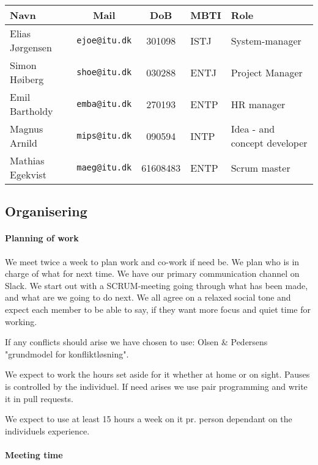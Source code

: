 \documentclass[11pt]{article}
\begin{document}
\begin{table}[h!]
    \centering
    \begin{tabular}{l c c l l}
        \textbf{Navn} & \textbf{Mail} & \textbf{DoB} & \textbf{MBTI} & \textbf{Role} \\ \hline
        Elias Jørgensen & \texttt{ejoe@itu.dk} & 301098 & ISTJ & System-manager\\
        Simon Høiberg & \texttt{shoe@itu.dk} & 030288 & ENTJ & Project Manager \\
        Emil Bartholdy & \texttt{emba@itu.dk} & 270193 & ENTP & HR manager\\
        Magnus Arnild & \texttt{mips@itu.dk} & 090594 & INTP & Idea - and concept developer\\
        Mathias Egekvist & \texttt{maeg@itu.dk} & 61608483 & ENTP & Scrum master \\
    \end{tabular}
\end{table}

\subsection{Organisering}

\paragraph{Planning of work}
We meet twice a week to plan work and co-work if need be. We plan who is in charge of what for next time. We have our primary communication channel on Slack.
We start out with a SCRUM-meeting going through what has been made, and what are we going to do next.
We all agree on a relaxed social tone and expect each member to be able to say, if they want more focus and quiet time for working.

If any conflicts should arise we have chosen to use:
Olsen & Pedersens "grundmodel for konfliktløsning".

We expect to work the hours set aside for it whether at home or on sight. Pauses is controlled by the individuel. If need arises we use pair programming and write it in pull requests.

We expect to use at least 15 hours a week on it pr. person dependant on the individuels experience.

\paragraph{Meeting time}
\end{document}
